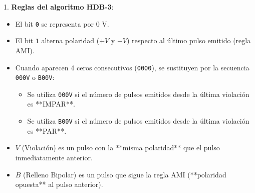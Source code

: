 \begin{resolucion}
{\begin{resolucion}
1. \textbf{Reglas del algoritmo HDB-3}:
   \begin{itemize}
       \item El bit \texttt{0} se representa por $0\text{ V}$.
       \item El bit \texttt{1} alterna polaridad ($+V$ y $-V$) respecto al último pulso emitido (regla AMI).
       \item Cuando aparecen $4$ ceros consecutivos (\texttt{0000}), se sustituyen por la secuencia \texttt{000V} o \texttt{B00V}:
         \begin{itemize}
             \item Se utiliza \texttt{000V} si el número de pulsos emitidos desde la última violación es **IMPAR**.
             \item Se utiliza \texttt{B00V} si el número de pulsos emitidos desde la última violación es **PAR**.
         \end{itemize}
       \item $V$ (Violación) es un pulso con la **misma polaridad** que el pulso inmediatamente anterior.
       \item $B$ (Relleno Bipolar) es un pulso que sigue la regla AMI (**polaridad opuesta** al pulso anterior).
   \end{itemize}


\end{resolucion}}
\end{resolucion}
